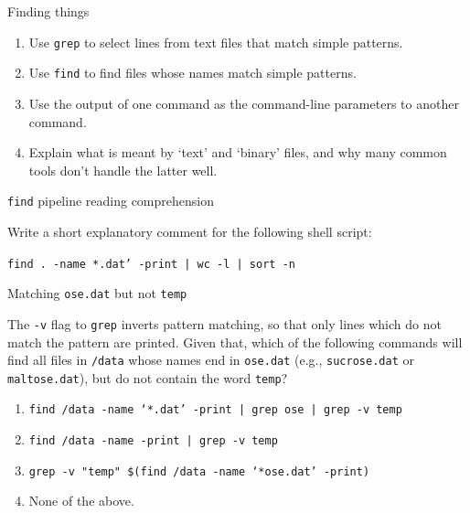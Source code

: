 \documentclass{beamer}
\begin{document}
\begin{frame}{Finding things}

\begin{enumerate}
    \item{Use \texttt{grep} to select lines from text files that match simple patterns.}
    \item{Use \texttt{find} to find files whose names match simple patterns.}
    \item{Use the output of one command as the command-line parameters to another command.}
    \item{Explain what is meant by `text' and `binary' files, and why many common tools don't handle the latter well.}
\end{enumerate}


\end{frame}


\begin{frame}{\texttt{find} pipeline reading comprehension}

Write a short explanatory comment for the following shell script:
\vspace{0.5cm}

\begin{beamerboxesrounded}[upper=uppercolgreen,lower=lowercolgreen,shadow=false]{}
\texttt{find . -name *.dat' -print | wc -l | sort -n}
\end{beamerboxesrounded}


\end{frame}


\begin{frame}{Matching \texttt{ose.dat} but not \texttt{temp}}

The \texttt{-v} flag to \texttt{grep} inverts pattern matching, so that only lines which do not match the pattern are printed. Given that, which of the following commands will find all files in \texttt{/data} whose names end in \texttt{ose.dat} (e.g., \texttt{sucrose.dat} or \texttt{maltose.dat}), but do not contain the word \texttt{temp}?


\begin{enumerate}

\item{\texttt{find /data -name `*.dat' -print | grep ose | grep -v temp}}
\item{\texttt{find /data -name  -print | grep -v temp}}
\item{\texttt{grep -v "temp" \$(find /data -name `*ose.dat' -print)}}
\item{None of the above.}

\end{enumerate}

\end{frame}
\end{document}
